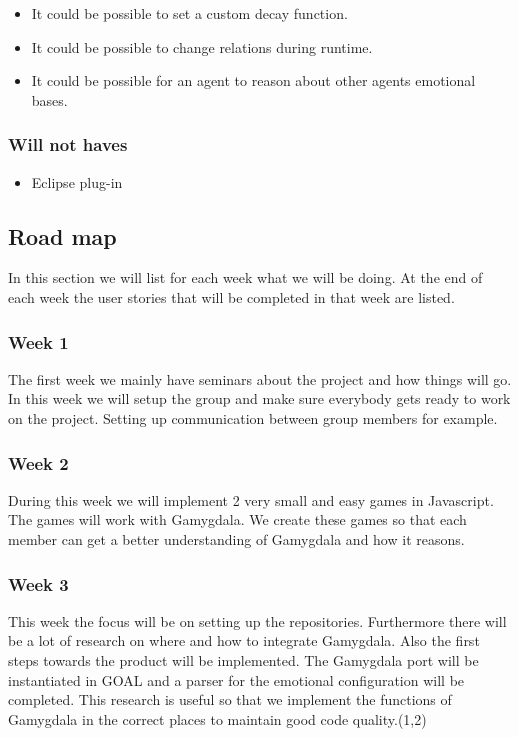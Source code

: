 \documentclass[]{article}
\begin{document}
\begin{itemize}
	\item It could be possible to set a custom decay function.
	\item It could be possible to change relations during runtime.
	
	\item It could be possible for an agent to reason about other agents emotional bases.
\end{itemize}

\subsubsection*{Will not haves}
\begin{itemize}
	\item Eclipse plug-in
\end{itemize}

\subsection{Road map}
In this section we will list for each week what we will be doing. At the end of each week the user stories that will be completed in that week are listed.
\subsubsection*{Week 1}
The first week we mainly have seminars about the project and how things will go. In this week we will setup the group and make sure everybody gets ready to work on the project. Setting up communication between group members for example.

\subsubsection*{Week 2}
During this week we will implement 2 very small and easy games in Javascript. The games will work with Gamygdala. We create these games so that each member can get a better understanding of Gamygdala and how it reasons.

\subsubsection*{Week 3}
This week the focus will be on setting up the repositories. Furthermore there will be a lot of research on where and how to integrate Gamygdala. Also the first steps towards the product will be implemented. The Gamygdala port will be instantiated in GOAL and a parser for the emotional configuration will be completed. This research is useful so that we implement the functions of Gamygdala in the correct places to maintain good code quality.(1,2)
\end{document}
